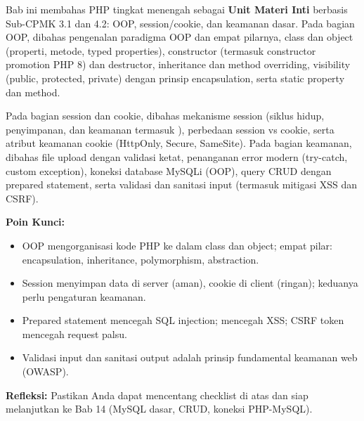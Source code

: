 \documentclass[../main.tex]{subfiles}
\begin{document}
\begin{rangkuman}
Bab ini membahas PHP tingkat menengah sebagai \textbf{Unit Materi Inti} berbasis Sub-CPMK 3.1 dan 4.2: OOP, session/cookie, dan keamanan dasar. Pada bagian OOP, dibahas pengenalan paradigma OOP dan empat pilarnya, class dan object (properti, metode, typed properties), constructor (termasuk constructor promotion PHP 8) dan destructor, inheritance dan method overriding, visibility (public, protected, private) dengan prinsip encapsulation, serta static property dan method.

Pada bagian session dan cookie, dibahas mekanisme session (siklus hidup, penyimpanan, dan keamanan termasuk ), perbedaan session vs cookie, serta atribut keamanan cookie (HttpOnly, Secure, SameSite). Pada bagian keamanan, dibahas file upload dengan validasi ketat, penanganan error modern (try-catch, custom exception), koneksi database MySQLi (OOP), query CRUD dengan prepared statement, serta validasi dan sanitasi input (termasuk mitigasi XSS dan CSRF).

\textbf{Poin Kunci:}
\begin{itemize}
  \item OOP mengorganisasi kode PHP ke dalam class dan object; empat pilar: encapsulation, inheritance, polymorphism, abstraction.
  \item Session menyimpan data di server (aman), cookie di client (ringan); keduanya perlu pengaturan keamanan.
  \item Prepared statement mencegah SQL injection;  mencegah XSS; CSRF token mencegah request palsu.
  \item Validasi input dan sanitasi output adalah prinsip fundamental keamanan web (OWASP).
\end{itemize}

\textbf{Refleksi:} Pastikan Anda dapat mencentang checklist di atas dan siap melanjutkan ke Bab 14 (MySQL dasar, CRUD, koneksi PHP-MySQL).
\end{rangkuman}

\ifSubfilesClassLoaded{
  \renewcommand{\bibname}{Daftar Pustaka}
  
  
}{}
\end{document}

